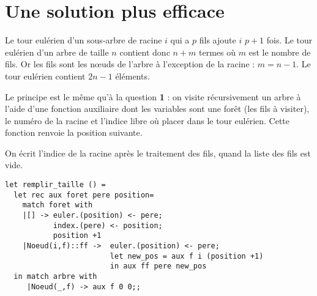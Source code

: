 \section{Une solution plus efficace}
\begin{Exercise}
Le tour eulérien d'un sous-arbre de racine $i$ qui a $p$ fils ajoute $i$ $p+1$ fois. Le tour eulérien d'un arbre de taille $n$ contient donc $n+m$ termes où $m$ est le nombre de fils. Or les fils sont les nœuds de l'arbre à l'exception de la racine  : $m=n-1$. Le tour eulérien contient $2n-1$ éléments.
\end{Exercise}
\begin{Exercise}


Le principe est le même qu'à la question {\bf 1} : on visite récursivement un arbre à l'aide d'une fonction auxiliaire dont les variables sont une forêt (les fils à visiter), le numéro de la racine et l'indice libre où placer dans le tour eulérien. Cette fonction renvoie la position suivante.

On écrit l'indice de la racine après le traitement des fils, quand la liste des fils est vide.

\begin{lstlisting}
let remplir_taille () =
  let rec aux foret pere position=
    match foret with
    |[] -> euler.(position) <- pere;
           index.(pere) <- position;
           position +1
    |Noeud(i,f)::ff -> 	euler.(position) <- pere;
                        let new_pos = aux f i (position +1) 
                        in aux ff pere new_pos
  in match arbre with 
     |Noeud(_,f) -> aux f 0 0;;
\end{lstlisting}
\end{Exercise}
\newpage

